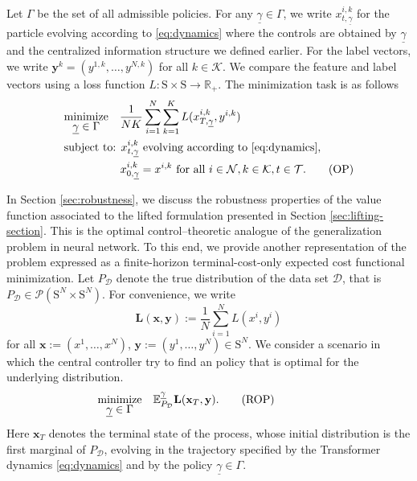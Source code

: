 \documentclass[11pt]{article}
\newcommand{\RR}{\mathbb{R}}
\newcommand{\EE}{\mathbb{E}}
\newcommand{\cD}{\mathcal{D}}
\newcommand{\cK}{\mathcal{K}}
\newcommand{\cN}{\mathcal{N}}
\newcommand{\cP}{\mathcal{P}}
\newcommand{\cT}{\mathcal{T}}
\begin{document}
Let $\Gamma$ be the set of all admissible policies. For any $\underline{\gamma}\in\Gamma$, we write $x_{t,\underline{\gamma}}^{i,k}$ for the particle evolving according to \eqref{eq:dynamics} where the controls are obtained by $\underline{\gamma}$ and the centralized information structure we defined earlier. For the label vectors, we write $\mathbf{y}^k = (y^{1,k},\ldots,y^{N,k})$ for all $k\in\cK$. We compare the feature and label vectors using a loss function $L:\mathrm{S}\times\mathrm{S}\to\RR_+$. The minimization task is as follows
\begin{align*}
    &\underset{\displaystyle\underline{\gamma}\in\Gamma}{\text{minimize}}\quad\frac{1}{NK}\sum_{i=1}^N\sum_{k=1}^K L(x_{T,\underline{\gamma}}^{i,k}, y^{i,k}) \\
    &\text{subject to: } x_{t,\underline{\gamma}}^{i,k} \text{ evolving according to \eqref{eq:dynamics}},\\
    &\hspace{5em} x_{0,\underline{\gamma}}^{i,k} = x^{i,k} \text{ for all } i\in\cN, k\in\cK, t\in\cT. \tag{OP}\label{prob:original}
\end{align*}

In Section \ref{sec:robustness}, we discuss the robustness properties of the value function associated to the lifted formulation presented in Section \ref{sec:lifting-section}. This is the optimal control--theoretic analogue of the generalization problem in neural network. To this end, we provide another representation of the problem expressed as a finite-horizon terminal-cost-only expected cost functional minimization. Let $P_\cD$ denote the true distribution of the data set $\cD$, that is $P_\cD \in \cP(\mathrm{S}^N\times\mathrm{S}^N)$. For convenience, we write
\begin{equation*}
    \mathbf{L}(\mathbf{x}, \mathbf{y}) := \frac{1}{N}\sum_{i=1}^N L(x^i, y^i)
\end{equation*}
for all $\mathbf{x} := (x^1,\ldots,x^N)$, $\mathbf{y} := (y^1,\ldots,y^N) \in \mathrm{S}^N$. We consider a scenario in which the central controller try to find an policy that is optimal for the underlying distribution. 
\begin{align*}
    &\hspace{-3em}\underset{\displaystyle\underline{\gamma}\in\Gamma}{\text{minimize}}\quad\EE_{P_\cD}^{\underline{\gamma}}\mathbf{L}(\mathbf{x}_{T}, \mathbf{y}). \tag{ROP}\label{prob:robustness-original}
\end{align*}
Here $\mathbf{x}_T$ denotes the terminal state of the process, whose initial distribution is the first marginal of $P_\cD$, evolving in the trajectory specified by the Transformer dynamics \eqref{eq:dynamics} and by the policy $\underline{\gamma}\in\Gamma$.
\end{document}

